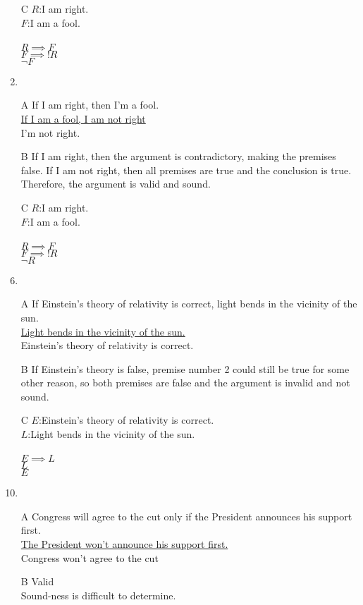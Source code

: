 \documentclass{article}
\begin{document}
\begin{enumerate}
\item[C]
$R$:I am right.\\
$F$:I am a fool.\\
\\
$R \implies F$\\
\underline{$F \implies !R$}\\
$\lnot F$
\item
\item[A]
If I am right, then I'm a fool.
\\\underline{If I am a fool, I am not right}
\\I'm not right.
\item[B]
If I am right, then the argument is contradictory, making the premises false. If I am not right, then all premises are true and the conclusion is true. Therefore, the argument is valid and sound.
\item[C]
$R$:I am right.\\
$F$:I am a fool.\\
\\
$R \implies F$\\
\underline{$F \implies !R$}\\
$\lnot R$
\item
\item[A]
If Einstein's theory of relativity is correct, light bends in the vicinity of the sun.
\\\underline{Light bends in the vicinity of the sun.}
\\Einstein's theory of relativity is correct.
\item[B]
If Einstein's theory is false, premise number 2 could still be true for some other reason, so both premises are false and the argument is invalid and not sound.
\item[C]
$E$:Einstein's theory of relativity is correct.\\
$L$:Light bends in the vicinity of the sun.\\
\\
$E \implies L$\\
\underline{$L$}\\
$E$
\item
\item[A]
Congress will agree to the cut only if the President announces his support first.
\\\underline{The President won't announce his support first.}
\\Congress won't agree to the cut
\item[B]
Valid
\\Sound-ness is difficult to determine.

\end{enumerate}
\end{document}
